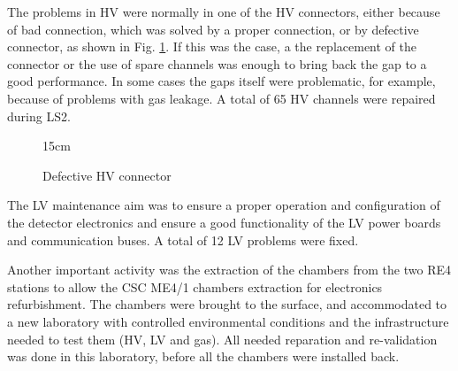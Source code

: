 The problems in HV were normally in one of the HV connectors, either because of bad connection, which was solved by a proper connection, or by defective connector, as shown in Fig. \ref{fig:HV_crack}. If this was the case, a the replacement of the connector or the use of spare channels was enough to bring back the gap to a good performance. In some cases the gaps itself were problematic, for example, because of problems with gas leakage. A total of 65 HV channels were repaired during LS2. 

\begin{figure}[!htm]{15cm}
\caption{Defective HV connector}%
\label{fig:HV_crack}
\end{figure}

The LV maintenance aim was to ensure a proper operation and configuration of the detector electronics and ensure a good functionality of the LV power boards and communication buses. A total of 12 LV problems were fixed.

Another important activity was the extraction of the chambers from the two RE4 stations to allow the CSC ME4/1 chambers extraction for electronics  refurbishment. The chambers were brought to the surface, and accommodated to a new laboratory with controlled environmental conditions and the infrastructure needed to test them (HV, LV and gas). All needed reparation and re-validation was done in this laboratory, before all the chambers were installed back.

